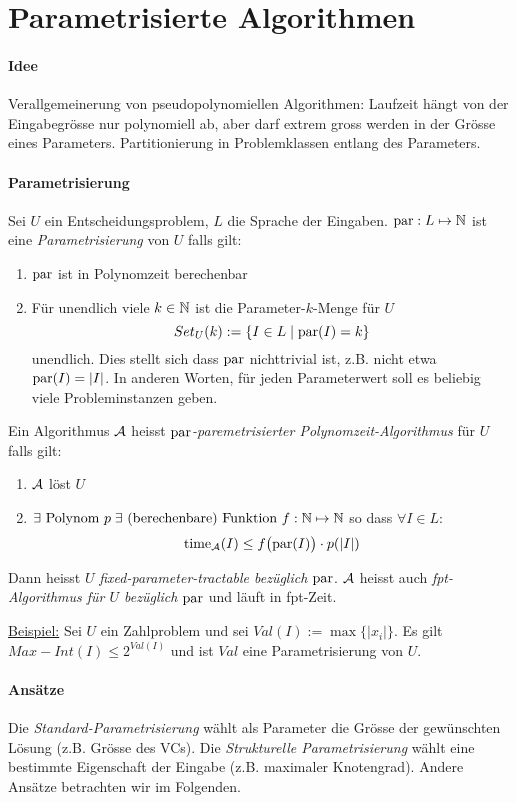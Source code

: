 \section{Parametrisierte Algorithmen}

\paragraph{Idee}
Verallgemeinerung von pseudopolynomiellen Algorithmen:
Laufzeit hängt von der Eingabegrösse nur polynomiell ab, aber darf extrem gross werden in der Grösse eines Parameters.
Partitionierung in Problemklassen entlang des Parameters.

\paragraph{Parametrisierung}
Sei $U$ ein Entscheidungsproblem, $L$ die Sprache der Eingaben.
$\text{par}: L \mapsto \mathbb{N}$ ist eine \emph{Parametrisierung} von $U$ falls gilt:
\begin{enumerate}[label=(\roman*)]
    \item $\text{par}$ ist in Polynomzeit berechenbar
    \item Für unendlich viele $k \in \mathbb{N}$ ist die Parameter-$k$-Menge für $U$
    $$ Set_U(k) := \{ I \in L \; | \; \text{par}(I) = k \} $$ unendlich.
    Dies stellt sich dass $\text{par}$ nichttrivial ist, z.B. nicht etwa $\text{par}(I) = |I|$.
    In anderen Worten, für jeden Parameterwert soll es beliebig viele Probleminstanzen geben.
\end{enumerate}
Ein Algorithmus $\mathcal{A}$ heisst \emph{$\text{par}$-paremetrisierter Polynomzeit-Algorithmus} für $U$ falls gilt:
\begin{enumerate}[label=(\roman*)]
    \item $\mathcal{A}$ löst $U$
    \item $ \exists \text{ Polynom } p \; \exists \text{ (berechenbare) Funktion } f : \mathbb{N} \mapsto \mathbb{N}$
    so dass $\forall I \in L$:
    $$\text{time}_{\mathcal{A}}(I) \leq f \big( \text{par}(I) \big) \cdot p(|I|) $$
\end{enumerate}
Dann heisst $U$ \emph{fixed-parameter-tractable bezüglich $\text{par}$}.
$\mathcal{A}$ heisst auch \emph{fpt-Algorithmus für $U$ bezüglich $\text{par}$} und läuft in fpt-Zeit.

\underline{Beispiel:}
Sei $U$ ein Zahlproblem und sei $Val(I) := \max \{ |x_i| \}$.
Es gilt $Max-Int(I) \leq 2^{Val(I)}$ und ist $Val$ eine Parametrisierung von $U$.

\paragraph{Ansätze}
Die \emph{Standard-Parametrisierung} wählt als Parameter die Grösse der gewünschten Lösung (z.B. Grösse des VCs).
Die \emph{Strukturelle Parametrisierung} wählt eine bestimmte Eigenschaft der Eingabe (z.B. maximaler Knotengrad).
Andere Ansätze betrachten wir im Folgenden.


